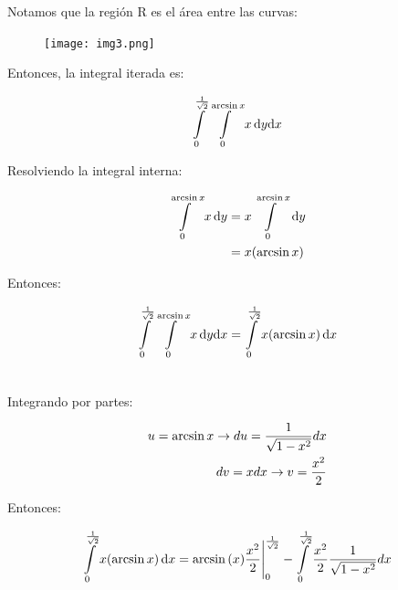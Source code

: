 \documentclass[11pt]{report}
\begin{document}
Notamos que la región R es el área entre las curvas:

\begin{figure}[h]
\texttt{[image: img3.png]}
\centering
\end{figure}

Entonces, la integral iterada es:

\[ \int \limits_0^{\frac{1}{\sqrt{2}}} \int \limits_0^{\arcsin{x}} x \, \text dy \text dx \]

Resolviendo la integral interna:

\begin{align*}
        \int \limits_0^{\arcsin{x}} x \, \text dy & =  x \int \limits_0^{\arcsin{x}} \, \text dy \\ \notag
        & = x (\arcsin{x})
\end{align*}

Entonces:

\begin{align*}
        \int \limits_0^{\frac{1}{\sqrt{2}}}
        \int \limits_0^{\arcsin{x}} x \, \text dy \text dx &=
        \int \limits_0^{\frac{1}{\sqrt{2}}} x (\arcsin{x}) \, \text dx \\ \notag
\end{align*}

Integrando por partes:

\begin{align*}
        u = \arcsin{x} \rightarrow du = \frac{1}{\sqrt{1 - x^2}} dx \\ \notag
        dv = x dx \rightarrow v = \frac{x^2}{2}
\end{align*}

Entonces:

\begin{align*}
        \int \limits_0^{\frac{1}{\sqrt{2}}} x (\arcsin{x}) \, \text dx
        &= \arcsin{(x)} \frac{x^2}{2} \Bigg|_0^{\frac{1}{\sqrt{2}}}
        - \int \limits_0^{\frac{1}{\sqrt{2}}} \frac{x^2}{2} \frac{1}{\sqrt{1 - x^2}} dx \\ \notag
\end{align*}
\end{document}
